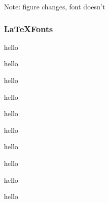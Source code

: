 \begin{frame}
\end{frame}

\begin{frame}
\end{frame}

\begin{frame}
\end{frame}

\begin{frame}
  \begin{columns}
  \end{columns}
\end{frame}


\begin{frame}
\end{frame}

\begin{frame}
\end{frame}

\begin{frame}
\end{frame}


\begin{frame}
\end{frame}

\usebackgroundtemplate{}

\begin{frame}
Note: figure changes, font doesn't
\end{frame}



\usebackgroundtemplate{}
\begin{frame}\frametitle{\LaTeX Fonts}
\tiny hello

\scriptsize hello

\footnotesize hello

\small hello

\normalsize hello

\large hello

\Large hello

\LARGE hello

\huge hello

\Huge hello
\end{frame}





